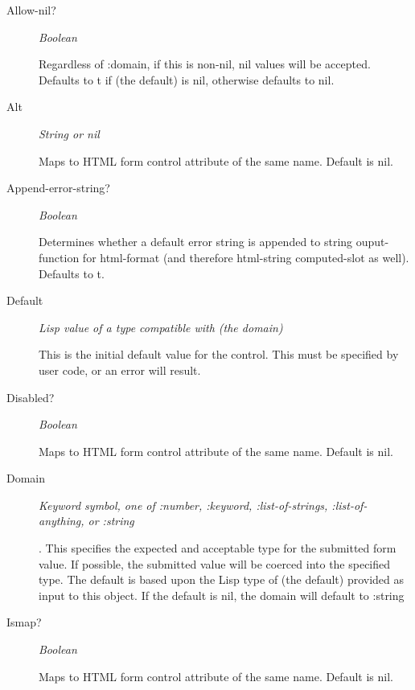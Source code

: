 \documentclass [11pt]{book}
\begin{document}
\begin{itemize}
\begin{description}
\item [Allow-nil?]
\emph{Boolean}

 Regardless of :domain, if this is non-nil, nil values will be accepted. Defaults to t if (the default) is nil,
otherwise defaults to nil.




\item [Alt]
\emph{String or nil}

 Maps to HTML form control attribute of the same name. Default is nil.




\item [Append-error-string?]
\emph{Boolean}

 Determines whether a default error string is appended to string ouput-function for
html-format (and therefore html-string computed-slot as well). Defaults to t.




\item [Default]
\emph{Lisp value of a type compatible with (the domain)}

 This is the initial default value for the control.
This must be specified by user code, or an error will result.




\item [Disabled?]
\emph{Boolean}

 Maps to HTML form control attribute of the same name. Default is nil.




\item [Domain]
\emph{Keyword symbol, one of :number, :keyword, :list-of-strings, :list-of-anything, or :string}

.
This specifies the expected and acceptable type for the submitted form value. If possible, the
submitted value will be coerced into the specified type. The default is based upon
the Lisp type of (the default) provided as input to this object. If the default is nil,
the domain will default to :string




\item [Ismap?]
\emph{Boolean}

 Maps to HTML form control attribute of the same name. Default is nil.





\end{description}
\end{itemize}
\end{document}
